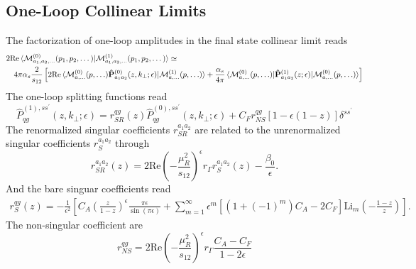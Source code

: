 \documentclass[a4paper,11pt]{article}
\begin{document}
\subsection{One-Loop Collinear Limits}
The factorization of one-loop amplitudes in the final state collinear limit reads 
\begin{equation}
\begin{split}
&2 \text{Re} \braket{\mathcal{M}_{a_1, a_2, \dots}^{(0)} (p_1, p_2, \dots) | \mathcal{M}^{(1)}_{a_1, a_2, \dots}(p_1, p_2, \dots)} \simeq \\ 
&\quad 4 \pi \alpha_s \frac{2}{s_{12}} \left[ 2 \text{Re} \braket{\mathcal{M}^{(0)}_{a, \dots} (p, \ldots) \mathbf{\hat{P}}_{a_1 a_2}^{(0)}(z, k_\perp; \epsilon) | \mathcal{M}^{(1)}_{a, \dots} (p, \ldots)} + \frac{\alpha_s}{4 \pi} \braket{\mathcal{M}^{(0)}_{a, \dots} (p, \ldots) | \mathbf{\hat{P}}_{a_1 a_2}^{(1)}(z; \epsilon) | \mathcal{M}^{(0)}_{a, \dots} (p, \ldots)} \right]
\end{split}
\end{equation}
The one-loop splitting functions read 
\begin{equation}
\hat{P}_{qg}^{(1), s s^\prime} (z, k_\perp; \epsilon) = r_{SR}^{qg}(z) \hat{P}_{qg}^{(0), s s^\prime} (z, k_\perp; \epsilon) + C_F r_{NS}^{qg}  \left[1 - \epsilon (1 - z) \right] \delta^{s s^\prime}
\end{equation}
The renormalized singular coefficients $r_{SR}^{a_1 a_2}$ are related to the unrenormalized singular coefficients $r_{S}^{a_1 a_2}$ through 
\begin{equation}
r_{SR}^{a_1 a_2} (z) = 2 \text{Re} \left(- \frac{\mu_R^2}{s_{12}} \right)^\epsilon r_\Gamma r_S^{a_1 a_2}(z) - \frac{\beta_0}{\epsilon}.
\end{equation} 
And the bare singuar coefficients read 
\begin{equation}
\begin{split}
r_{S}^{qg}(z) = -\frac{1}{\epsilon^2} \left[ C_A \left(\frac{z}{1 - z} \right)^\epsilon \frac{\pi \epsilon}{\sin (\pi \epsilon)} + \sum_{m = 1}^\infty \epsilon^m \left[ (1 + (-1)^m) C_A - 2 C_F \right] \text{Li}_m\! \left(- \frac{1 - z}{z} \right) \right].
\end{split}
\end{equation}
The non-singular coefficient are 
\begin{equation}
r_{NS}^{qg} = 2 \text{Re} \left(- \frac{\mu_R^2}{s_{12}} \right)^\epsilon r_\Gamma \frac{C_A - C_F}{1 - 2 \epsilon}
\end{equation}
\end{document}
